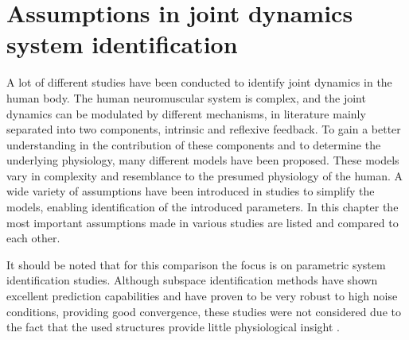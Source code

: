 


\chapter{Assumptions in joint dynamics system identification}
\label{chap:assumptions}
A lot of different studies have been conducted to identify joint dynamics in the human body. The human neuromuscular system is complex, and the joint dynamics can be modulated by different mechanisms, in literature mainly separated into two components, intrinsic and reflexive feedback. To gain a better understanding in the contribution of these components and to determine the underlying physiology, many different models have been proposed. These models vary in complexity and resemblance to the presumed physiology of the human. A wide variety of assumptions have been introduced in studies to simplify the models, enabling identification of the introduced parameters. In this chapter the most important assumptions made in various studies are listed and compared to each other.


It should be noted that for this comparison the focus is on parametric system identification studies. Although subspace identification methods have shown excellent prediction capabilities and have proven to be very robust to high noise conditions, providing good convergence, these studies were not considered due to the fact that the used structures provide little physiological insight \cite{jalaleddini_subspace_2017}. 

